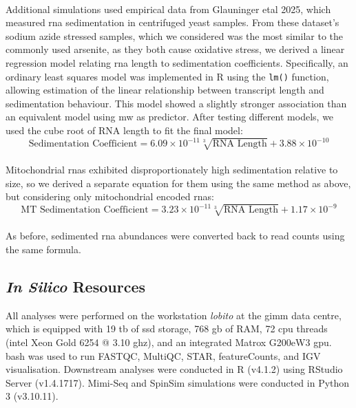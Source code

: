 \\
\linebreak
\noindent
Additional simulations used empirical data from Glauninger \gls{etal} 2025\cite{glauninger_transcriptome-wide_2025}, which measured \gls{rna} sedimentation in centrifuged yeast samples. From these dataset’s sodium azide stressed samples, which we considered was the most similar to the commonly used arsenite, as they both cause oxidative stress\cite{garg_elucidation_2020}, we derived a linear regression model relating \gls{rna} length to sedimentation coefficients. Specifically, an ordinary least squares model was implemented in R using the \texttt{lm()} function, allowing estimation of the linear relationship between transcript length and sedimentation behaviour. This model showed a slightly stronger association than an equivalent model using \gls{mw} as predictor. After testing different models, we used the cube root of RNA length to fit the final model:
\begin{equation}
	\text{Sedimentation Coefficient} =
	6.09 \times 10^{-11}\sqrt[3]{\text{RNA Length}} + 3.88 \times 10^{-10}
\end{equation}
\\
Mitochondrial \glspl{rna} exhibited disproportionately high sedimentation relative to size, so we derived a separate equation for them using the same method as above, but considering only mitochondrial encoded \glspl{rna}:
\begin{equation}
	\text{MT Sedimentation Coefficient} =
	3.23 \times 10^{-11} \sqrt[3]{\text{RNA Length}} + 1.17 \times 10^{-9}
\end{equation}
\\
As before, sedimented \gls{rna} abundances were converted back to read counts using the same formula. 

\subsection{\textit{In Silico} Resources}

All analyses were performed on the workstation \textit{lobito} at the \gls{gimm} data centre, which is equipped with 19 \gls{tb} of \gls{ssd} storage, 768 \gls{gb} of RAM, 72 \gls{cpu} threads (\gls{intel} Xeon Gold 6254 @ 3.10 \gls{ghz}), and an integrated Matrox G200eW3 \gls{gpu}. \gls{bash} was used to run FASTQC\cite{andrews_fastqc_2010}, MultiQC\cite{ewels_multiqc_2016}, STAR\cite{dobin_star_2013}, featureCounts\cite{liao_featurecounts_2014}, and IGV visualisation. Downstream analyses were conducted in R (v4.1.2) using RStudio Server (v1.4.1717). Mimi-Seq and SpinSim simulations were conducted in Python 3 (v3.10.11). 

